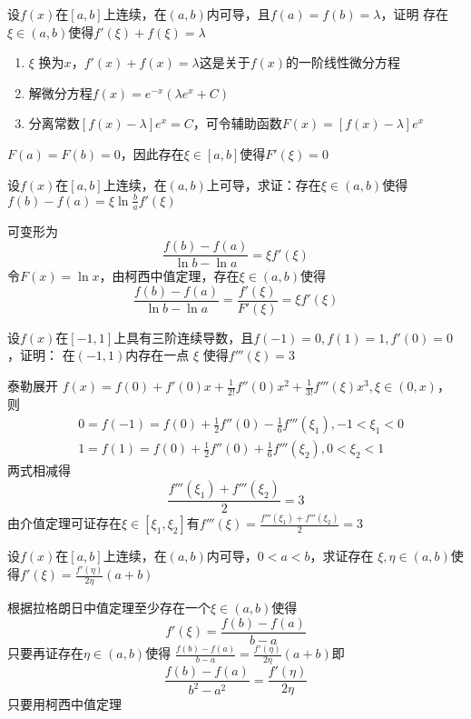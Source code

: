 \documentclass{article}
\begin{document}
\begin{examplle}[]
设\(f(x)\)在\([a,b]\)上连续，在\((a,b)\)内可导，且\(f(a)=f(b)=\lambda\)，证明
存在\(\xi\in(a,b)\)使得\(f'(\xi)+f(\xi)=\lambda\)

\begin{enumerate}
\item \(\xi\) 换为\(x\)，\(f'(x)+f(x)=\lambda\)这是关于\(f(x)\)的一阶线性微分方程
\item 解微分方程\(f(x)=e^{-x}(\lambda e^x+C)\)
\item 分离常数\([f(x)-\lambda]e^x=C\)，可令辅助函数\(F(x)=[f(x)-\lambda]e^x\)
\end{enumerate}


\(F(a)=F(b)=0\)，因此存在\(\xi\in[a,b]\)使得\(F'(\xi)=0\)
\end{examplle}

\begin{examplle}[]
设\(f(x)\)在\([a,b]\)上连续，在\((a,b)\)上可导，求证：存在\(\xi\in(a,b)\)使得
\(f(b)-f(a)=\xi\ln\frac{b}{a}f'(\xi)\)

可变形为
\begin{equation*}
\frac{f(b)-f(a)}{\ln b-\ln a}=\xi f'(\xi)
\end{equation*}
令\(F(x)=\ln x\)，由柯西中值定理，存在\(\xi\in(a,b)\)使得
\begin{equation*}
\frac{f(b)-f(a)}{\ln b-\ln a}=\frac{f'(\xi)}{F'(\xi)}=\xi f'(\xi)
\end{equation*}
\end{examplle}

\begin{examplle}[]
设\(f(x)\)在\([-1,1]\)上具有三阶连续导数，且\(f(-1)=0,f(1)=1,f'(0)=0\)，证明：
在\((-1,1)\)内存在一点 \(\xi\) 使得\(f'''(\xi)=3\)

泰勒展开
\(f(x)=f(0)+f'(0)x+\frac{1}{2!}f''(0)x^2+\frac{1}{3!}f'''(\xi)x^3,\xi\in(0,x)\)，
则
\begin{align*}
&0=f(-1)=f(0)+\frac{1}{2}f''(0)-\frac{1}{6}f'''(\xi_1),-1<\xi_1<0\\
&1=f(1)=f(0)+\frac{1}{2}f''(0)+\frac{1}{6}f'''(\xi_2),0<\xi_2<1
\end{align*}
两式相减得
\begin{equation*}
\frac{f'''(\xi_1)+f'''(\xi_2)}{2}=3
\end{equation*}
由介值定理可证存在\(\xi\in[\xi_1,\xi_2]\)有\(f'''(\xi)=\frac{f'''(\xi_1)+f'''(\xi_2)}{2}=3\)
\end{examplle}

\begin{examplle}[]
设\(f(x)\)在\([a,b]\)上连续，在\((a,b)\)内可导，\(0<a<b\)，求证存在
\(\xi,\eta\in(a,b)\)使得\(f'(\xi)=\frac{f'(\eta)}{2\eta}(a+b)\)

根据拉格朗日中值定理至少存在一个\(\xi\in(a,b)\)使得
\begin{equation*}
f'(\xi)=\frac{f(b)-f(a)}{b-a}
\end{equation*}
只要再证存在\(\eta\in(a,b)\)使得
\(\frac{f(b)-f(a)}{b-a}=\frac{f'(\eta)}{2\eta}(a+b)\)即
\begin{equation*}
\frac{f(b)-f(a)}{b^2-a^2}=\frac{f'(\eta)}{2\eta}
\end{equation*}
只要用柯西中值定理
\end{examplle}
\end{document}

